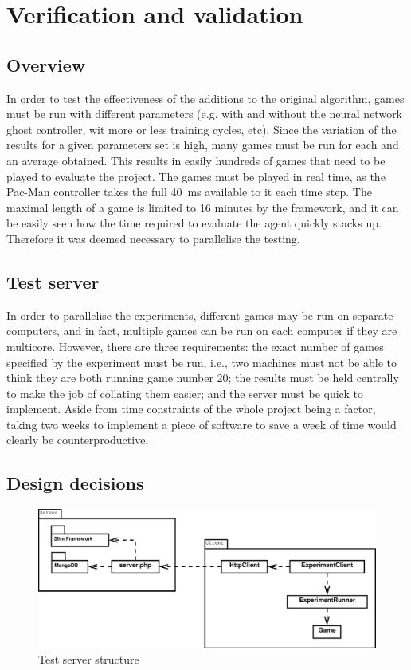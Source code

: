 \chapter{Verification and validation}
\label{ch:verification}

\section{Overview}

In order to test the effectiveness of the additions to the original algorithm, games must be run with different parameters (e.g. with and without the neural network ghost controller, wit more or less training cycles, etc).  Since the variation of the results for a given parameters set is high, many games must be run for each and an average obtained.  This results in easily hundreds of games that need to be played to evaluate the project.  The games must be played in real time, as the Pac-Man controller takes the full 40~ms available to it each time step.  The maximal length of a game is limited to 16 minutes by the framework, and it can be easily seen how the time required to evaluate the agent quickly stacks up.  Therefore it was deemed necessary to parallelise the testing.

\section{Test server}

In order to parallelise the experiments, different games may be run on separate computers, and in fact, multiple games can be run on each computer if they are multicore.  However, there are three requirements: the exact number of games specified by the experiment must be run, i.e., two machines must not be able to think they are both running game number 20; the results must be held centrally to make the job of collating them easier; and the server must be quick to implement.  Aside from time constraints of the whole project being a factor, taking two weeks to implement a piece of software to save a week of time would clearly be counterproductive.

\section{Design decisions}

\begin{figure}
\includegraphics[width=\linewidth]{diagrams/testserver}
\caption{Test server structure}
\label{fig:testserver}
\end{figure}


